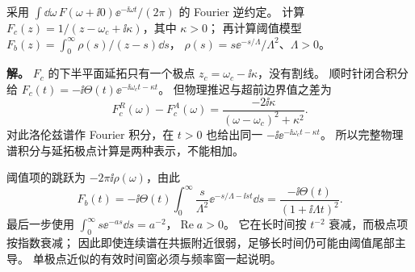 \begin{exbox}[一个衰减极点与连续阈值的时间响应]
采用 $\int\dd\omega\,F(\omega+\ii0)\ee^{-\ii\omega t}/(2\pi)$ 的 Fourier 逆约定。
计算 $F_c(z)=1/(z-\omega_c+\ii\kappa)$，其中 $\kappa>0$；
再计算阈值模型 $F_b(z)=\int_0^\infty\rho(s)/(z-s)\dd s$，
$\rho(s)=s\ee^{-s/\Lambda}/\Lambda^2$、$\Lambda>0$。

\textbf{解。} $F_c$ 的下半平面延拓只有一个极点 $z_c=\omega_c-\ii\kappa$，没有割线。
顺时针闭合积分给 $F_c(t)=-\ii\Theta(t)\ee^{-\ii\omega_ct-\kappa t}$。
但物理推迟与超前边界值之差为
\[
F_c^R(\omega)-F_c^A(\omega)
=\frac{-2\ii\kappa}{(\omega-\omega_c)^2+\kappa^2}.
\]
对此洛伦兹谱作 Fourier 积分，在 $t>0$ 也给出同一 $-\ii\ee^{-\ii\omega_ct-\kappa t}$。
所以完整物理谱积分与延拓极点计算是两种表示，不能相加。

阈值项的跳跃为 $-2\pi\ii\rho(\omega)$，由此
\[
F_b(t)=-\ii\Theta(t)\int_0^\infty\frac{s}{\Lambda^2}
\ee^{-s/\Lambda-\ii st}\dd s
=\frac{-\ii\Theta(t)}{(1+\ii\Lambda t)^2}.
\]
最后一步使用 $\int_0^\infty s\ee^{-as}\dd s=a^{-2}$，$\operatorname{Re}a>0$。
它在长时间按 $t^{-2}$ 衰减，而极点项按指数衰减；
因此即使连续谱在共振附近很弱，足够长时间仍可能由阈值尾部主导。
单极点近似的有效时间窗必须与频率窗一起说明。
\end{exbox}


